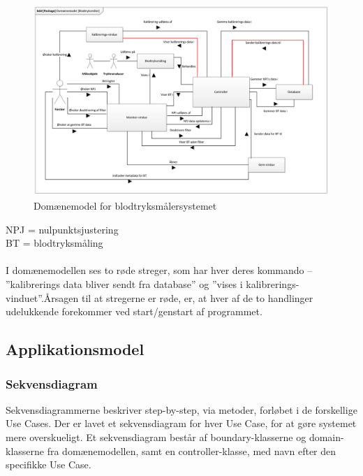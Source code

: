 \begin{figure}[H]
	\centering
	\includegraphics[width=1 \textwidth]{Figurer/Snip20151104_30}
	\caption{Domænemodel for blodtryksmålersystemet}
\end{figure}

NPJ = nulpunktsjustering\\
BT = blodtryksmåling
\\ \\
I domænemodellen ses to røde streger, som har hver deres kommando – ”kalibrerings data bliver sendt fra database” og ”vises i kalibrerings-vinduet”.Årsagen til at stregerne er røde, er, at hver af de to handlinger udelukkende forekommer ved start/genstart af programmet.

\subsection{Applikationsmodel}

\subsubsection{Sekvensdiagram}
Sekvensdiagrammerne beskriver step-by-step, via metoder, forløbet i de forskellige Use Cases. Der er lavet et sekvensdiagram for hver Use Case, for at gøre systemet mere overskueligt. Et sekvensdiagram består af boundary-klasserne og domain-klasserne fra domænemodellen, samt en controller-klasse, med navn efter den specifikke Use Case.

